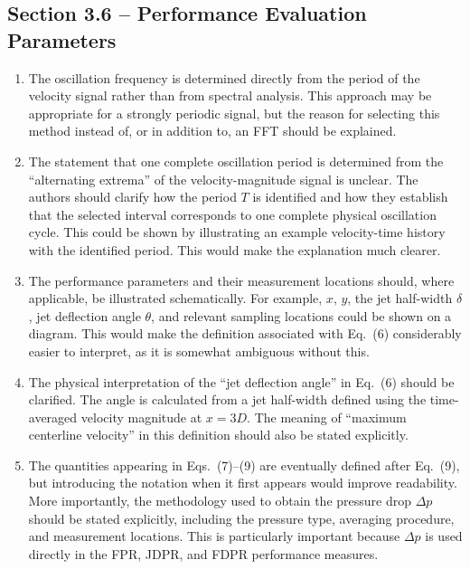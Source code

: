 \documentclass[11pt]{article}
\begin{document}
	
	\subsection*{Section 3.6 -- Performance Evaluation Parameters}
	
	\begin{enumerate}
		\item The oscillation frequency is determined directly from the period of the velocity signal rather than from spectral analysis. This approach may be appropriate for a strongly periodic signal, but the reason for selecting this method instead of, or in addition to, an FFT should be explained. 
		
		\item The statement that one complete oscillation period is determined from the ``alternating extrema'' of the velocity-magnitude signal is unclear. The authors should clarify how the period $T$ is identified and how they establish that the selected interval corresponds to one complete physical oscillation cycle. This could be shown by illustrating an example velocity-time history with the identified period. This would make the explanation much clearer.
		
		\item The performance parameters and their measurement locations should, where applicable, be illustrated schematically. For example, $x$, $y$, the jet half-width $\delta$, jet deflection angle $\theta$, and relevant sampling locations could be shown on a diagram. This would make the definition associated with Eq.~(6) considerably easier to interpret, as it is somewhat ambiguous without this.
		
		\item The physical interpretation of the ``jet deflection angle'' in Eq.~(6) should be clarified. The angle is calculated from a jet half-width defined using the time-averaged velocity magnitude at $x=3D$. The meaning of ``maximum centerline velocity'' in this definition should also be stated explicitly.
		
		\item The quantities appearing in Eqs.~(7)--(9) are eventually defined after Eq.~(9), but introducing the notation when it first appears would improve readability. More importantly, the methodology used to obtain the pressure drop $\Delta p$ should be stated explicitly, including the pressure type, averaging procedure, and measurement locations. This is particularly important because $\Delta p$ is used directly in the FPR, JDPR, and FDPR performance measures.
		

\end{enumerate}
\end{document}
